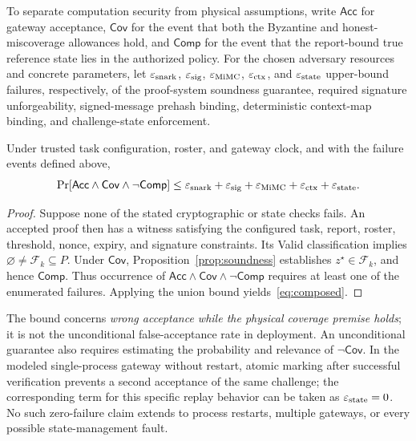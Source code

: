 To separate computation security from physical assumptions, write $\mathsf{Acc}$ for gateway acceptance, $\mathsf{Cov}$ for the event that both the Byzantine and honest-miscoverage allowances hold, and $\mathsf{Comp}$ for the event that the report-bound true reference state lies in the authorized policy. For the chosen adversary resources and concrete parameters, let $\varepsilon_{\rm snark}$, $\varepsilon_{\rm sig}$, $\varepsilon_{\rm MiMC}$, $\varepsilon_{\rm ctx}$, and $\varepsilon_{\rm state}$ upper-bound failures, respectively, of the proof-system soundness guarantee, required signature unforgeability, signed-message prehash binding, deterministic context-map binding, and challenge-state enforcement.

\begin{proposition}\label{prop:composition}
Under trusted task configuration, roster, and gateway clock, and with the failure events defined above,
\begin{equation}\label{eq:composed}
\Pr[\mathsf{Acc}\land\mathsf{Cov}\land\neg\mathsf{Comp}]
\leq \varepsilon_{\rm snark}+\varepsilon_{\rm sig}
+\varepsilon_{\rm MiMC}+\varepsilon_{\rm ctx}+\varepsilon_{\rm state}.
\end{equation}
\end{proposition}
\begin{proof}
Suppose none of the stated cryptographic or state checks fails. An accepted proof then has a witness satisfying the configured task, report, roster, threshold, nonce, expiry, and signature constraints. Its Valid classification implies $\varnothing\ne\mathcal F_k\subseteq P$. Under $\mathsf{Cov}$, Proposition~\ref{prop:soundness} establishes $z^\star\in\mathcal F_k$, and hence $\mathsf{Comp}$. Thus occurrence of $\mathsf{Acc}\land\mathsf{Cov}\land\neg\mathsf{Comp}$ requires at least one of the enumerated failures. Applying the union bound yields~\eqref{eq:composed}.
\end{proof}

The bound concerns \emph{wrong acceptance while the physical coverage premise holds}; it is not the unconditional false-acceptance rate in deployment. An unconditional guarantee also requires estimating the probability and relevance of $\neg\mathsf{Cov}$. In the modeled single-process gateway without restart, atomic marking after successful verification prevents a second acceptance of the same challenge; the corresponding term for this specific replay behavior can be taken as $\varepsilon_{\rm state}=0$. No such zero-failure claim extends to process restarts, multiple gateways, or every possible state-management fault.

